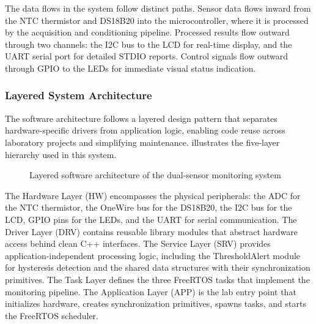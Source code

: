 The data flows in the system follow distinct paths. Sensor data flows inward from the NTC thermistor and DS18B20 into the microcontroller, where it is processed by the acquisition and conditioning pipeline. Processed results flow outward through two channels: the I2C bus to the LCD for real-time display, and the UART serial port for detailed STDIO reports. Control signals flow outward through GPIO to the LEDs for immediate visual status indication.

\subsubsection{Layered System Architecture}

The software architecture follows a layered design pattern that separates hardware-specific drivers from application logic, enabling code reuse across laboratory projects and simplifying maintenance.  illustrates the five-layer hierarchy used in this system.

\begin{figure}[H]
\centering
{}
\caption{Layered software architecture of the dual-sensor monitoring system}
\label{fig:layered_architecture}
\end{figure}

The Hardware Layer (HW) encompasses the physical peripherals: the ADC for the NTC thermistor, the OneWire bus for the DS18B20, the I2C bus for the LCD, GPIO pins for the LEDs, and the UART for serial communication. The Driver Layer (DRV) contains reusable library modules that abstract hardware access behind clean C++ interfaces. The Service Layer (SRV) provides application-independent processing logic, including the ThresholdAlert module for hysteresis detection and the shared data structures with their synchronization primitives. The Task Layer defines the three FreeRTOS tasks that implement the monitoring pipeline. The Application Layer (APP) is the lab entry point that initializes hardware, creates synchronization primitives, spawns tasks, and starts the FreeRTOS scheduler.

